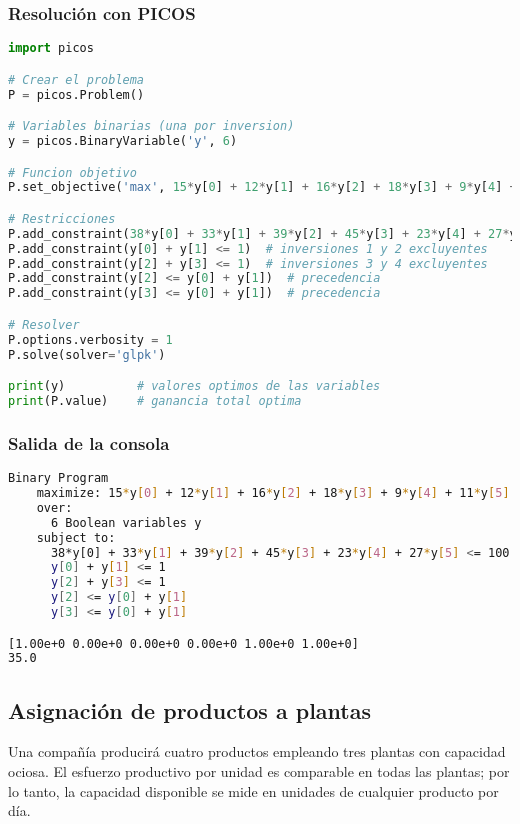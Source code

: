 \documentclass[12pt]{article}
\begin{document}
\subsubsection{Resolución con PICOS}
\begin{lstlisting}[language=Python]
import picos

# Crear el problema
P = picos.Problem()

# Variables binarias (una por inversion)
y = picos.BinaryVariable('y', 6)

# Funcion objetivo
P.set_objective('max', 15*y[0] + 12*y[1] + 16*y[2] + 18*y[3] + 9*y[4] + 11*y[5])

# Restricciones
P.add_constraint(38*y[0] + 33*y[1] + 39*y[2] + 45*y[3] + 23*y[4] + 27*y[5] <= 100)
P.add_constraint(y[0] + y[1] <= 1)  # inversiones 1 y 2 excluyentes
P.add_constraint(y[2] + y[3] <= 1)  # inversiones 3 y 4 excluyentes
P.add_constraint(y[2] <= y[0] + y[1])  # precedencia
P.add_constraint(y[3] <= y[0] + y[1])  # precedencia

# Resolver
P.options.verbosity = 1
P.solve(solver='glpk')

print(y)          # valores optimos de las variables
print(P.value)    # ganancia total optima
\end{lstlisting}

\subsubsection{Salida de la consola}

\begin{lstlisting}[language=bash,backgroundcolor=\color{black},basicstyle=\color{white}\ttfamily,numbers=none]
Binary Program
    maximize: 15*y[0] + 12*y[1] + 16*y[2] + 18*y[3] + 9*y[4] + 11*y[5]
    over:
      6 Boolean variables y
    subject to:
      38*y[0] + 33*y[1] + 39*y[2] + 45*y[3] + 23*y[4] + 27*y[5] <= 100
      y[0] + y[1] <= 1
      y[2] + y[3] <= 1
      y[2] <= y[0] + y[1]
      y[3] <= y[0] + y[1]

[1.00e+0 0.00e+0 0.00e+0 0.00e+0 1.00e+0 1.00e+0]
35.0
\end{lstlisting}

\subsection{Asignación de productos a plantas}
Una compañía producirá cuatro productos empleando tres plantas con capacidad ociosa. El esfuerzo productivo por unidad es comparable en todas las plantas; por lo tanto, la capacidad disponible se mide en unidades de cualquier producto por día.
\end{document}
